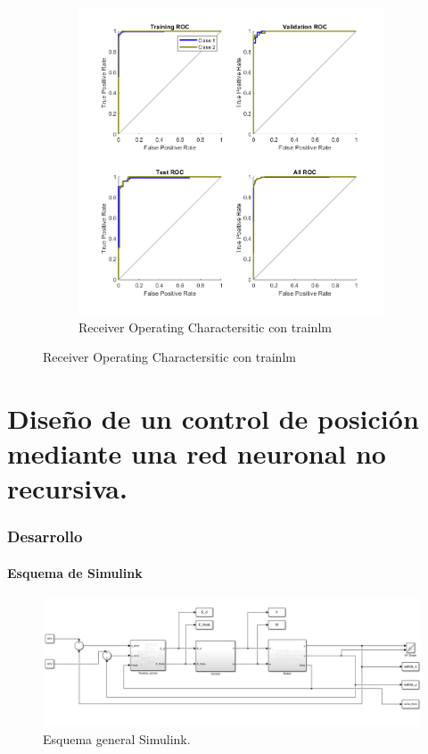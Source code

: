 \documentclass[a4paper, 12pt]{article}
\begin{document}
\begin{figure}[htp!]
\begin{subfigure}{0.49\textwidth}
                        \includegraphics[width=\textwidth]{figures/parte1/Ej4/ej4_roc_trainlm_60.png}
                        \caption{Receiver Operating Charactersitic con trainlm}
                    \end{subfigure}
                \end{figure}
                \newpage
                
	\part{Diseño de un control de posición mediante una red neuronal no recursiva.}
	
	\section{Desarrollo}
	
	\subsection{Esquema de Simulink}
		\begin{figure}[htp!]
			\centering
			\includegraphics[width=1\textwidth]{figures/parte2/ejerA.png}
			\caption{Esquema general Simulink.}
		\end{figure}
		
\end{document}
